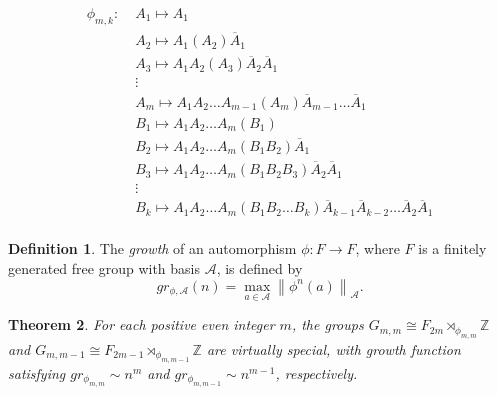 \documentclass[oneside,11pt,reqno]{amsart}
\newtheorem{thm}{Theorem}[section]
\theoremstyle{definition}
\newtheorem{defn}[thm]{Definition}
\newcommand{\norm}[1]{\left\lVert{#1}\right\rVert}
\begin{document}
\begin{align*}
\phi_{m,k} : \; & A_1 \mapsto A_1\\
& A_2 \mapsto A_1 (A_2) {\overline{A}_1}\\
& A_3 \mapsto A_1 A_2 (A_3) {\overline{A}_2} {\overline{A}_1}\\
& \vdots\\
& A_m \mapsto A_1 A_2 \ldots A_{m-1} (A_m) \overline{A}_{m-1} \ldots \overline{A}_1\\
& B_1 \mapsto A_1 A_2 \ldots A_m (B_1)\\
& B_2 \mapsto A_1 A_2 \ldots A_m (B_1 B_2) \overline{A}_1\\
& B_3 \mapsto A_1 A_2 \ldots A_m (B_1 B_2 B_3) \overline{A}_2 \overline{A}_1\\
& \vdots\\
& B_k \mapsto A_1 A_2 \ldots A_m (B_1 B_2 \ldots B_k) \overline{A}_{k-1} \overline{A}_{k-2} \ldots \overline{A}_2 \overline{A}_1 \\
\end{align*}



\begin{defn} 
    The \textit{growth} of an automorphism $\phi: F \rightarrow F$, where $F$ is a finitely generated free group with basis $\mathcal{A}$, is defined by 
    $$gr_{\phi, \mathcal{A}}(n)=  \max_{a \in \mathcal{A}}  \norm{\phi^n(a)}_\mathcal{A} .$$
\end{defn}


\begin{thm} \cite[Theorem A]{BS} \label{BSvspcl}  For each positive even integer $m$, the groups $G_{m,m} \cong F_{2m} \rtimes_{\phi_{m,m}} \mathbb{Z}$ and  $G_{m,m-1} \cong F_{2m-1} \rtimes_{\phi_{m,m-1}} \mathbb{Z}$ are virtually special, with growth function satisfying $gr_{\phi_{m,m}} \sim n^m$ and $gr_{\phi_{m,m-1}} \sim n^{m-1}$, respectively.
\end{thm}



\end{document}
